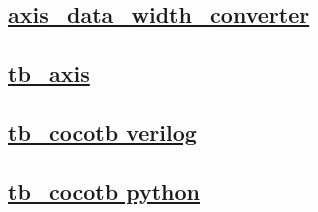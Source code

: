 \documentclass{article}
\begin{document}
  


  \subsection{\href{../files/axis_data_width_converter-v.html}{axis\_data\_width\_converter}}
  \subsection{\href{../files2/tb_axis-v.html}{tb\_axis}}
  \subsection{\href{../files2/tb_cocotb-v.html}{tb\_cocotb verilog}}
  \subsection{\href{../files2/tb_cocotb-py.html}{tb\_cocotb python}}
\end{document}
